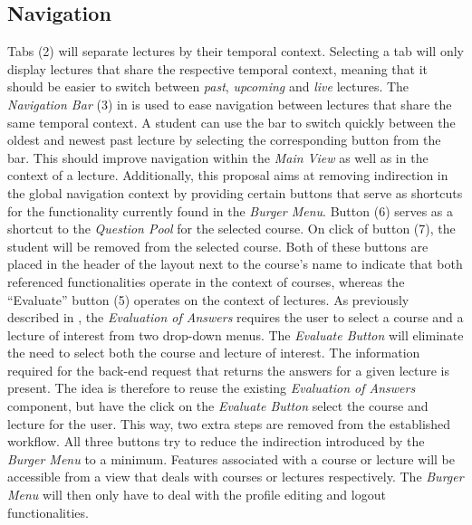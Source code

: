 \subsection{Navigation}
\label{section:con:proposals:mainview:navigation}
Tabs (2) will separate lectures by their temporal context. Selecting a tab will only display lectures that share the respective temporal context, meaning that it should be easier to switch between \emph{past}, \emph{upcoming} and \emph{live} lectures.
The \emph{Navigation Bar} (3) in  is used to ease navigation between lectures that share the same temporal context. A student can use the bar to switch quickly between the oldest and newest past lecture by selecting the corresponding button from the bar. This should improve navigation within the \emph{Main View} as well as in the context of a lecture. 
Additionally, this proposal aims at removing indirection in the global navigation context by providing certain buttons that serve as shortcuts for the functionality currently found in the \emph{Burger Menu}. Button (6) serves as a shortcut to the \emph{Question Pool} for the selected course. On click of button (7), the student will be removed from the selected course. Both of these buttons are placed in the header of the layout next to the course’s name to indicate that both referenced functionalities operate in the context of courses, whereas the “Evaluate” button (5) operates on the context of lectures.
\newline
\newline
As previously described in , the \emph{Evaluation of Answers} requires the user to select a course and a lecture of interest from two drop-down menus.
The \emph{Evaluate Button} will eliminate the need to select both the course and lecture of interest. The information required for the back-end request that returns the answers for a given lecture is present. The idea is therefore to reuse the existing \emph{Evaluation of Answers} component, but have the click on the \emph{Evaluate Button} select the course and lecture for the user. This way, two extra steps are removed from the established workflow.
\newline
\newline
All three buttons try to reduce the indirection introduced by the \emph{Burger Menu} to a minimum. Features associated with a course or lecture will be accessible from a view that deals with courses or lectures respectively. The \emph{Burger Menu} will then only have to deal with the profile editing and logout functionalities.


